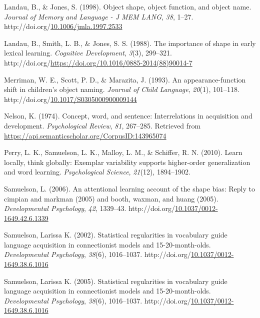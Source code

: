 \documentclass[10pt, letterpaper]{article}
\newenvironment{CSLReferences}%
  {}%
  {\par}
\begin{document}
\begin{CSLReferences}{1}{0}
\leavevmode{}%
Landau, B., \& Jones, S. (1998). Object shape, object function, and
object name. \emph{Journal of Memory and Language - J MEM LANG},
\emph{38}, 1--27.
http://doi.org/\href{https://doi.org/10.1006/jmla.1997.2533}{10.1006/jmla.1997.2533}

\leavevmode{}%
Landau, B., Smith, L. B., \& Jones, S. S. (1988). The importance of
shape in early lexical learning. \emph{Cognitive Development},
\emph{3}(3), 299--321.
http://doi.org/\url{https://doi.org/10.1016/0885-2014(88)90014-7}

\leavevmode{}%
Merriman, W. E., Scott, P. D., \& Marazita, J. (1993). An
appearance-function shift in children's object naming. \emph{Journal of
Child Language}, \emph{20}(1), 101--118.
http://doi.org/\href{https://doi.org/10.1017/S0305000900009144}{10.1017/S0305000900009144}

\leavevmode{}%
Nelson, K. (1974). Concept, word, and sentence: Interrelations in
acquisition and development. \emph{Psychological Review}, \emph{81},
267--285. Retrieved from
\url{https://api.semanticscholar.org/CorpusID:143965074}

\leavevmode{}%
Perry, L. K., Samuelson, L. K., Malloy, L. M., \& Schiffer, R. N.
(2010). Learn locally, think globally: Exemplar variability supports
higher-order generalization and word learning. \emph{Psychological
Science}, \emph{21}(12), 1894--1902.

\leavevmode{}%
Samuelson, L. (2006). An attentional learning account of the shape bias:
Reply to cimpian and markman (2005) and booth, waxman, and huang (2005).
\emph{Developmental Psychology}, \emph{42}, 1339--43.
http://doi.org/\href{https://doi.org/10.1037/0012-1649.42.6.1339}{10.1037/0012-1649.42.6.1339}

\leavevmode{}%
Samuelson, Larissa K. (2002). Statistical regularities in vocabulary
guide language acquisition in connectionist models and 15-20-month-olds.
\emph{Developmental Psychology}, \emph{38}(6), 1016--1037.
http://doi.org/\href{https://doi.org/10.1037/0012-1649.38.6.1016}{10.1037/0012-1649.38.6.1016}

\leavevmode{}%
Samuelson, Larissa K. (2005). Statistical regularities in vocabulary
guide language acquisition in connectionist models and 15-20-month-olds.
\emph{Developmental Psychology}, \emph{38}(6), 1016--1037.
http://doi.org/\href{https://doi.org/10.1037/0012-1649.38.6.1016}{10.1037/0012-1649.38.6.1016}


\end{CSLReferences}
\end{document}
